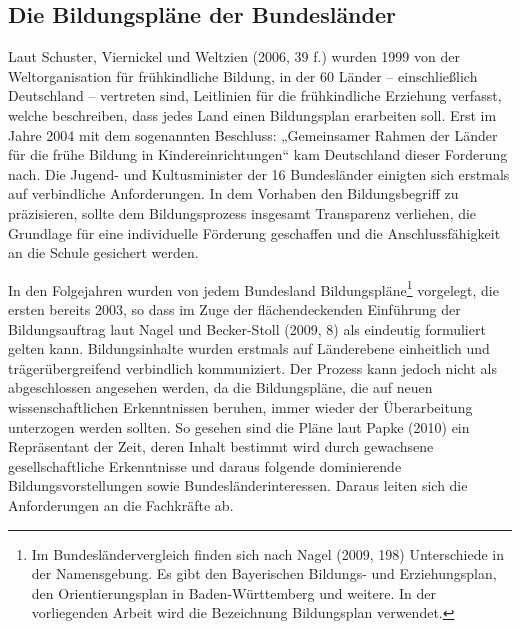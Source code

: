 \subsection{Die Bildungspläne der Bundesländer}
Laut Schuster, Viernickel und Weltzien (2006, 39 f.) wurden 1999 von der Weltorganisation für frühkindliche Bildung, in der 60 Länder -- einschließlich Deutschland -- vertreten sind, Leitlinien für die frühkindliche Erziehung verfasst, welche beschreiben, dass jedes Land einen Bildungsplan erarbeiten soll. Erst im Jahre 2004 mit dem sogenannten Beschluss: „Gemeinsamer Rahmen der Länder für die frühe Bildung in Kindereinrichtungen“ kam Deutschland dieser Forderung nach. Die Jugend- und Kultusminister der 16 Bundesländer einigten sich erstmals auf verbindliche Anforderungen. In dem Vorhaben den Bildungsbegriff zu präzisieren, sollte dem Bildungsprozess insgesamt Transparenz verliehen, die Grundlage für eine individuelle Förderung geschaffen und die Anschlussfähigkeit an die Schule gesichert werden. 

In den Folgejahren wurden von jedem Bundesland Bildungspläne\footnote{Im Bundesländervergleich finden sich nach Nagel (2009, 198) Unterschiede in der Namensgebung. Es gibt den Bayerischen Bildungs- und Erziehungsplan, den Orientierungsplan in Baden-Württemberg und weitere. In der vorliegenden Arbeit wird die Bezeichnung Bildungsplan verwendet.} vorgelegt, die ersten bereits 2003, so dass im Zuge der flächendeckenden Einführung der Bildungsauftrag laut Nagel und Becker-Stoll (2009, 8) als eindeutig formuliert gelten kann. Bildungsinhalte wurden erstmals auf Länderebene einheitlich und trägerübergreifend verbindlich kommuniziert. Der Prozess kann jedoch nicht als abgeschlossen angesehen werden, da die Bildungspläne, die auf neuen wissenschaftlichen Erkenntnissen beruhen, immer wieder der Überarbeitung unterzogen werden sollten. So gesehen sind die Pläne laut Papke (2010) ein Repräsentant der Zeit, deren Inhalt bestimmt wird durch gewachsene gesellschaftliche Erkenntnisse und daraus folgende dominierende Bildungsvorstellungen sowie Bundesländerinteressen. Daraus leiten sich die Anforderungen an die Fachkräfte ab. 

